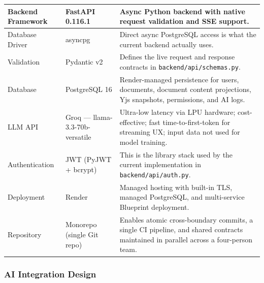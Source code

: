 \documentclass{article}
\begin{document}
{\begin{tabularx}{\textwidth}{|>{\hsize=0.4\hsize\raggedright\arraybackslash}X|>{\hsize=0.5\hsize\raggedright\arraybackslash}X|>{\hsize=1.1\hsize\raggedright\arraybackslash}X|}
    \hline
    Backend Framework & FastAPI 0.116.1 & Async Python backend with native request validation and SSE support. \\
    \hline
    Database Driver & asyncpg & Direct async PostgreSQL access is what the current backend actually uses. \\
    \hline
    Validation & Pydantic v2 & Defines the live request and response contracts in \texttt{backend/api/schemas.py}. \\
    \hline
    Database & PostgreSQL 16 & Render-managed persistence for users, documents, document content projections, Yjs snapshots, permissions, and AI logs. \\
    \hline
    LLM API & Groq — llama-3.3-70b-versatile & Ultra-low latency via LPU hardware; cost-effective; fast time-to-first-token for streaming UX; input data not used for model training. \\
    \hline
    Authentication & JWT (PyJWT + bcrypt) & This is the library stack used by the current implementation in \texttt{backend/api/auth.py}. \\
    \hline
    Deployment & Render & Managed hosting with built-in TLS, managed PostgreSQL, and multi-service Blueprint deployment. \\
    \hline
    Repository & Monorepo (single Git repo) & Enables atomic cross-boundary commits, a single CI pipeline, and shared contracts maintained in parallel across a four-person team. \\
    \hline
\end{tabularx}
}














\subsubsection{AI Integration Design}
\end{document}
